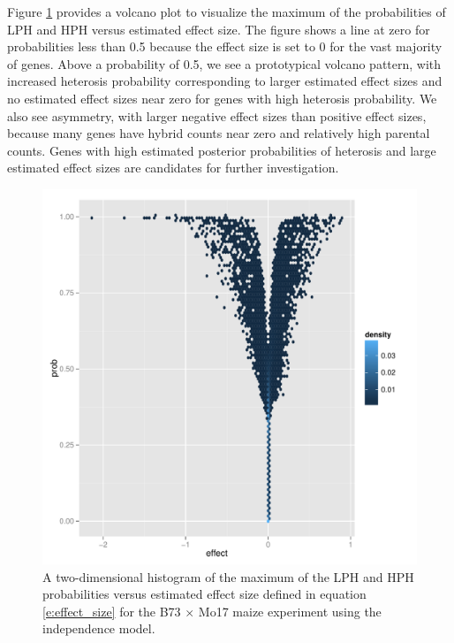 \documentclass[useAMS,usenatbib,referee]{biom}
\begin{document}
Figure \ref{f:volcano} provides a volcano plot to visualize the maximum of the probabilities of LPH and HPH versus estimated effect size. The figure shows a line at zero for probabilities less than 0.5 because the effect size is set to 0 for the vast majority of genes. Above a probability of 0.5, we see a prototypical volcano pattern, with increased  heterosis probability corresponding to larger estimated effect sizes and no estimated effect sizes near zero for genes with high heterosis probability. We also see asymmetry, with larger negative effect sizes than positive effect sizes, because many genes have hybrid counts near zero and relatively high parental counts. Genes with high estimated posterior probabilities of heterosis and large estimated effect sizes are candidates for further investigation.


\begin{figure}
\centerline{\includegraphics[width=\textwidth]{volcano}}
\caption{A two-dimensional histogram of the maximum of the LPH and HPH probabilities versus estimated effect size defined in equation \ref{e:effect_size} for the B73 $\times$ Mo17 maize experiment using the independence model.}
\label{f:volcano}
\end{figure}
\end{document}

